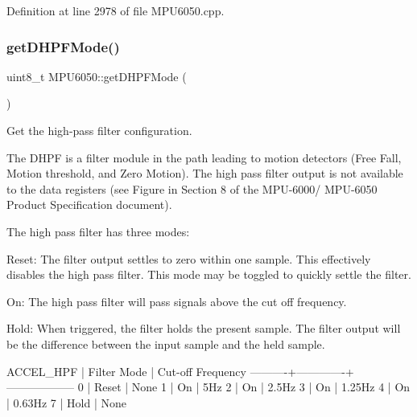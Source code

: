 Definition at line 2978 of file M\+P\+U6050.\+cpp.

\mbox{\label{classMPU6050_a4c3b84a906fcb5a65870fa557f797f4a}} 
\subsubsection{\texorpdfstring{getDHPFMode()}{getDHPFMode()}}
{\footnotesize\ttfamily uint8\+\_\+t M\+P\+U6050\+::get\+D\+H\+P\+F\+Mode (\begin{DoxyParamCaption}{ }\end{DoxyParamCaption})}



Get the high-\/pass filter configuration. 

The D\+H\+PF is a filter module in the path leading to motion detectors (Free Fall, Motion threshold, and Zero Motion). The high pass filter output is not available to the data registers (see Figure in Section 8 of the M\+P\+U-\/6000/ M\+P\+U-\/6050 Product Specification document).

The high pass filter has three modes\+:


\begin{DoxyPre}
   Reset: The filter output settles to zero within one sample. This
          effectively disables the high pass filter. This mode may be toggled
          to quickly settle the filter.\end{DoxyPre}



\begin{DoxyPre}   On:    The high pass filter will pass signals above the cut off frequency.\end{DoxyPre}



\begin{DoxyPre}   Hold:  When triggered, the filter holds the present sample. The filter
          output will be the difference between the input sample and the held
          sample.
\end{DoxyPre}



\begin{DoxyPre}
ACCEL\_HPF | Filter Mode | Cut-off Frequency
----------+-------------+------------------
0         | Reset       | None
1         | On          | 5Hz
2         | On          | 2.5Hz
3         | On          | 1.25Hz
4         | On          | 0.63Hz
7         | Hold        | None
\end{DoxyPre}


